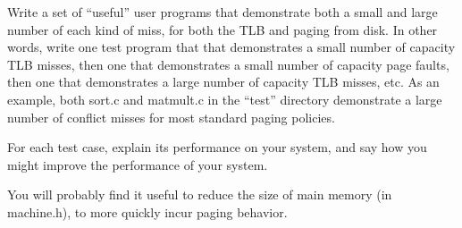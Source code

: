 \begin{description}
Write a set of ``useful'' user programs that demonstrate
both a small and large number of each kind of miss, for both the TLB and paging
from disk.  In other words, write one test program that
that demonstrates a small number of capacity TLB misses, then one that
demonstrates a small number of capacity page faults, then one that
demonstrates a large number of capacity TLB misses, etc.
As an example, both sort.c and matmult.c in the ``test'' directory
demonstrate a large number of conflict misses for most standard paging policies.

For each test case, explain its performance on your system, and say how
you might improve the performance of your system.

You will probably find it useful to reduce the size of main memory
(in machine.h), to more quickly incur paging behavior.
\end{description}


